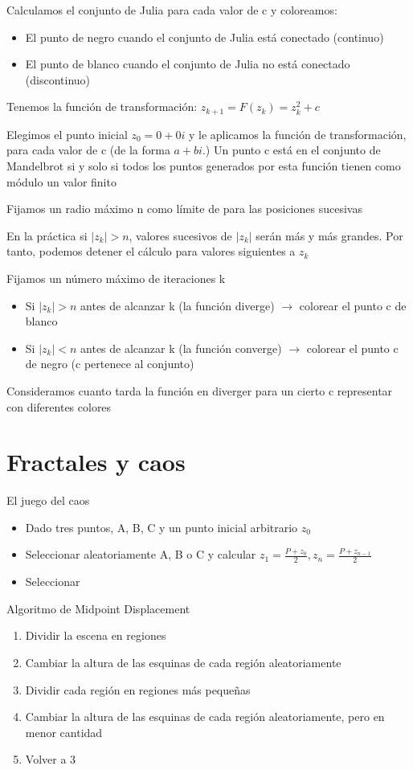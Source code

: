 Calculamos el conjunto de Julia para cada valor de c y coloreamos:
\begin{itemize}
    \item El punto de negro cuando el conjunto de Julia está conectado (continuo)
    \item El punto de blanco cuando el conjunto de Julia no está conectado (discontinuo)
\end{itemize}

Tenemos la función de transformación: $z_{k+1}=F(z_k)=z^2_k + c$

Elegimos el punto inicial $z_0 = 0 + 0i$ y le aplicamos la función de transformación, para
cada valor de c (de la forma $a + bi$.) Un punto c está en el conjunto de Mandelbrot si y solo si todos los puntos generados por esta función tienen como módulo un valor finito

Fijamos un radio máximo n como límite de para las posiciones sucesivas

En la práctica si $|z_k| > n$, valores sucesivos de $|z_k|$ serán más y más grandes. Por tanto,
podemos detener el cálculo para valores siguientes a $z_k$

Fijamos un número máximo de iteraciones k
\begin{itemize}
    \item Si $|z_k| > n$ antes de alcanzar k (la función diverge) $\rightarrow$ colorear el punto c de blanco
    \item Si $|z_k| < n$ antes de alcanzar k (la función converge) $\rightarrow$ colorear el punto c de negro (c pertenece al conjunto)
\end{itemize}

Consideramos cuanto tarda la función en diverger para un cierto c  representar con diferentes colores

\section{Fractales y caos}
El juego del caos
\begin{itemize}
    \item Dado tres puntos, A, B, C y un punto inicial arbitrario $z_0$
    \item Seleccionar aleatoriamente A, B o C y calcular $z_1 = \frac{P+ z_0}{2}, z_n = \frac{P+ z_{n-1}}{2}$
    \item Seleccionar
\end{itemize}

Algoritmo de Midpoint Displacement
\begin{enumerate}
    \item Dividir la escena en regiones
    \item Cambiar la altura de las esquinas de cada región aleatoriamente
    \item Dividir cada región en regiones más pequeñas
    \item Cambiar la altura de las esquinas de cada región aleatoriamente, pero en menor cantidad
    \item Volver a 3
\end{enumerate}
